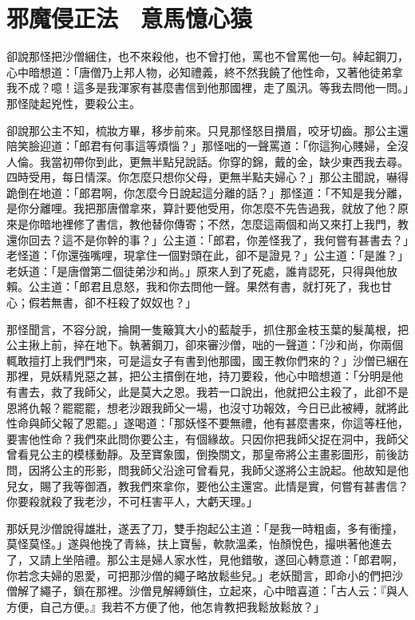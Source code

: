 
\chapter{邪魔侵正法　意馬憶心猿}

卻說那怪把沙僧綑住，也不來殺他，也不曾打他，罵也不曾罵他一句。綽起鋼刀，心中暗想道：「唐僧乃上邦人物，必知禮義，終不然我饒了他性命，又著他徒弟拿我不成？噫！這多是我渾家有甚麼書信到他那國裡，走了風汛。等我去問他一問。」那怪陡起兇性，要殺公主。

卻說那公主不知，梳妝方畢，移步前來。只見那怪怒目攢眉，咬牙切齒。那公主還陪笑臉迎道：「郎君有何事這等煩惱？」那怪咄的一聲罵道：「你這狗心賤婦，全沒人倫。我當初帶你到此，更無半點兒說話。你穿的錦，戴的金，缺少東西我去尋。四時受用，每日情深。你怎麼只想你父母，更無半點夫婦心？」那公主聞說，嚇得跪倒在地道：「郎君啊，你怎麼今日說起這分離的話？」那怪道：「不知是我分離，是你分離哩。我把那唐僧拿來，算計要他受用，你怎麼不先告過我，就放了他？原來是你暗地裡修了書信，教他替你傳寄；不然，怎麼這兩個和尚又來打上我門，教還你回去？這不是你幹的事？」公主道：「郎君，你差怪我了，我何嘗有甚書去？」老怪道：「你還強嘴哩，現拿住一個對頭在此，卻不是證見？」公主道：「是誰？」老妖道：「是唐僧第二個徒弟沙和尚。」原來人到了死處，誰肯認死，只得與他放賴。公主道：「郎君且息怒，我和你去問他一聲。果然有書，就打死了，我也甘心；假若無書，卻不枉殺了奴奴也？」

那怪聞言，不容分說，掄開一隻簸箕大小的藍靛手，抓住那金枝玉葉的髮萬根，把公主揪上前，捽在地下。執著鋼刀，卻來審沙僧，咄的一聲道：「沙和尚，你兩個輒敢擅打上我們門來，可是這女子有書到他那國，國王教你們來的？」沙僧已綑在那裡，見妖精兇惡之甚，把公主摜倒在地，持刀要殺，他心中暗想道：「分明是他有書去，救了我師父，此是莫大之恩。我若一口說出，他就把公主殺了，此卻不是恩將仇報？罷罷罷，想老沙跟我師父一場，也沒寸功報效，今日已此被縛，就將此性命與師父報了恩罷。」遂喝道：「那妖怪不要無禮，他有甚麼書來，你這等枉他，要害他性命？我們來此問你要公主，有個緣故。只因你把我師父捉在洞中，我師父曾看見公主的模樣動靜。及至寶象國，倒換關文，那皇帝將公主畫影圖形，前後訪問，因將公主的形影，問我師父沿途可曾看見，我師父遂將公主說起。他故知是他兒女，賜了我等御酒，教我們來拿你，要他公主還宮。此情是實，何嘗有甚書信？你要殺就殺了我老沙，不可枉害平人，大虧天理。」

那妖見沙僧說得雄壯，遂丟了刀，雙手抱起公主道：「是我一時粗鹵，多有衝撞，莫怪莫怪。」遂與他挽了青絲，扶上寶髻，軟款溫柔，怡顏悅色，撮哄著他進去了，又請上坐陪禮。那公主是婦人家水性，見他錯敬，遂回心轉意道：「郎君啊，你若念夫婦的恩愛，可把那沙僧的繩子略放鬆些兒。」老妖聞言，即命小的們把沙僧解了繩子，鎖在那裡。沙僧見解縛鎖住，立起來，心中暗喜道：「古人云：『與人方便，自己方便。』我若不方便了他，他怎肯教把我鬆放鬆放？」

